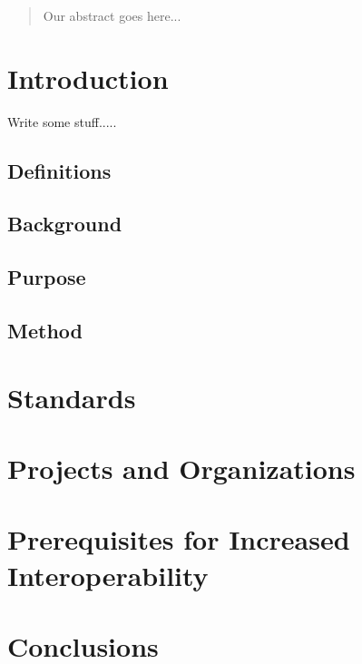 \documentclass[12pt]{article}
\begin{document}
\nocite{big}
\nocite{Sh:1}
\nocite{small} 




\tableofcontents
\newpage

\begin{abstract}
Our abstract goes here...
\end{abstract}
\newpage

\section{Introduction}
Write some stuff.....
\subsection{Definitions}
\subsection{Background}
\subsection{Purpose}
\subsection{Method}
\section{Standards}
\section{Projects and Organizations}
\section{Prerequisites for Increased Interoperability}
\section{Conclusions}

\newpage
\begin{appendix}


\end{appendix}

\newpage
 
 
\end{document}
